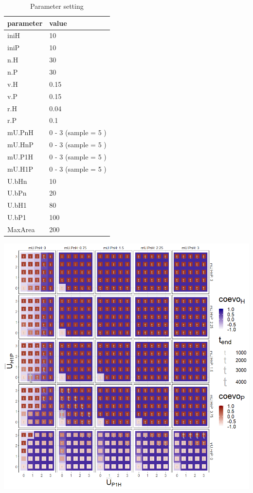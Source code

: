 \documentclass[
]{book}
\begin{document}
\begin{table}[!h]

\caption{\label{tab:4mUHPmUPHtablepdf}Parameter setting}
\centering
\begin{tabular}[t]{l|l}
\hline
parameter & value\\
\hline
iniH & 10\\
\hline
iniP & 10\\
\hline
n.H & 30\\
\hline
n.P & 30\\
\hline
v.H & 0.15\\
\hline
v.P & 0.15\\
\hline
r.H & 0.04\\
\hline
r.P & 0.1\\
\hline
mU.PnH & 0 - 3 (sample = 5 )\\
\hline
mU.HnP & 0 - 3 (sample = 5 )\\
\hline
mU.P1H & 0 - 3 (sample = 5 )\\
\hline
mU.H1P & 0 - 3 (sample = 5 )\\
\hline
U.bHn & 10\\
\hline
U.bPn & 20\\
\hline
U.bH1 & 80\\
\hline
U.bP1 & 100\\
\hline
MaxArea & 200\\
\hline
\end{tabular}
\end{table}

\newpage

\includegraphics[width=1\linewidth]{plots/4_fourPar-mU.HP-mU.PH_plot}
\end{document}
